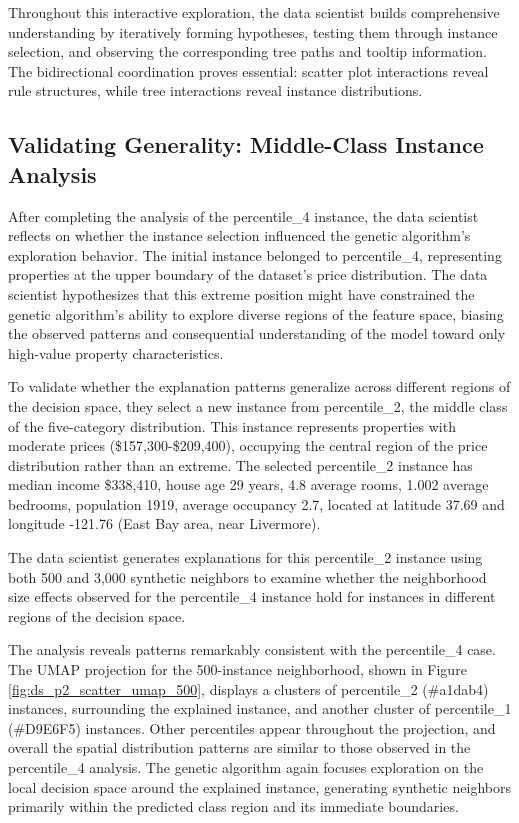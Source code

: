 Throughout this interactive exploration, the data scientist builds comprehensive understanding by iteratively forming hypotheses, testing them through instance selection, and observing the corresponding tree paths and tooltip information. The bidirectional coordination proves essential: scatter plot interactions reveal rule structures, while tree interactions reveal instance distributions.

\subsection{Validating Generality: Middle-Class Instance Analysis}

After completing the analysis of the percentile\_4 instance, the data scientist reflects on whether the instance selection influenced the genetic algorithm's exploration behavior. The initial instance belonged to percentile\_4, representing properties at the upper boundary of the dataset's price distribution. The data scientist hypothesizes that this extreme position might have constrained the genetic algorithm's ability to explore diverse regions of the feature space, biasing the observed patterns and consequential understanding of the model toward only high-value property characteristics.

To validate whether the explanation patterns generalize across different regions of the decision space, they select a new instance from percentile\_2, the middle class of the five-category distribution. This instance represents properties with moderate prices (\$157,300-\$209,400), occupying the central region of the price distribution rather than an extreme. The selected percentile\_2 instance has median income \$338,410, house age 29 years, 4.8 average rooms, 1.002 average bedrooms, population 1919, average occupancy 2.7, located at latitude 37.69 and longitude -121.76 (East Bay area, near Livermore).

The data scientist generates explanations for this percentile\_2 instance using both 500 and 3,000 synthetic neighbors to examine whether the neighborhood size effects observed for the percentile\_4 instance hold for instances in different regions of the decision space.

The analysis reveals patterns remarkably consistent with the percentile\_4 case. The UMAP projection for the 500-instance neighborhood, shown in Figure \ref{fig:ds_p2_scatter_umap_500}, displays a clusters of percentile\_2 (\#a1dab4) instances, surrounding the explained instance, and another cluster of percentile\_1 (\#D9E6F5) instances. Other percentiles appear throughout the projection, and overall the spatial distribution patterns are similar to those observed in the percentile\_4 analysis. The genetic algorithm again focuses exploration on the local decision space around the explained instance, generating synthetic neighbors primarily within the predicted class region and its immediate boundaries.


